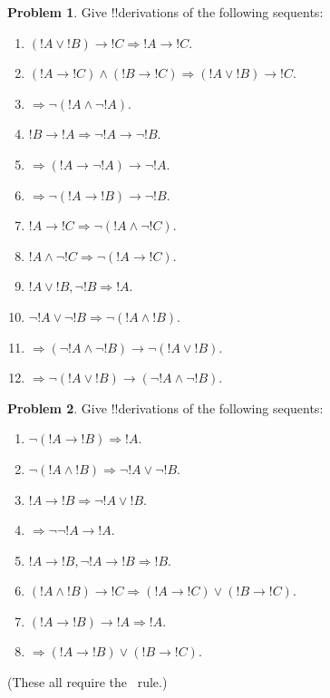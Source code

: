 \documentclass[10pt,a4paper]{article}
\theoremstyle{plain}
\theoremstyle{definition}
\newtheorem{prob}{Problem}[section]
\theoremstyle{remark}
\providecommand{\lif}{\mathbin{\rightarrow}}
\providecommand{\Sequent}{\mathrel{\Rightarrow}}
\providecommand{\RightR}[1]{}
\providecommand{\RightR}{\mathrm{R}}
\providecommand{\Contraction}{\mathrm{C}}
\providecommand{\Contraction}{\mathrm{C}}
\begin{document}
\begin{prob}
Give !!{derivation}s of the following sequents:
\begin{enumerate}
\item $(!A \lor !B) \lif !C \Sequent !A \lif !C$.
\item $(!A \lif !C) \land (!B \lif !C) \Sequent (!A \lor !B) \lif !C$.
\item $\Sequent \lnot(!A \land \lnot !A)$.
\item $!B \lif !A \Sequent \lnot !A \lif \lnot !B$.
\item $\Sequent (!A \lif \lnot !A) \lif \lnot !A$.
\item $\Sequent \lnot(!A \lif !B) \lif \lnot !B$.
\item $!A \lif !C \Sequent \lnot (!A \land \lnot !C)$.
\item $!A \land \lnot !C \Sequent \lnot (!A \lif !C)$.
\item $!A \lor !B, \lnot !B \Sequent !A$.
\item $\lnot !A \lor \lnot !B \Sequent \lnot(!A \land !B)$.
\item $\Sequent (\lnot !A \land \lnot !B) \lif\lnot(!A \lor !B)$.
\item $\Sequent \lnot(!A \lor !B) \lif (\lnot !A \land \lnot !B)$.
\end{enumerate}
\end{prob}

\begin{prob}
Give !!{derivation}s of the following sequents:
\begin{enumerate}
\item $\lnot(!A \lif !B) \Sequent !A$.
\item $\lnot(!A \land !B) \Sequent \lnot !A \lor \lnot !B$.
\item $!A \lif !B \Sequent \lnot !A \lor !B$.
\item $\Sequent \lnot \lnot !A \lif !A$.
\item $!A \lif !B, \lnot !A \lif !B \Sequent !B$.
\item $(!A \land !B) \lif !C \Sequent (!A \lif !C) \lor (!B \lif !C)$.
\item $(!A \lif !B) \lif !A \Sequent !A$.
\item $\Sequent (!A \lif !B) \lor (!B \lif !C)$.
\end{enumerate}
(These all require the $\RightR{\Contraction}$~rule.)
\end{prob}

\end{document}
